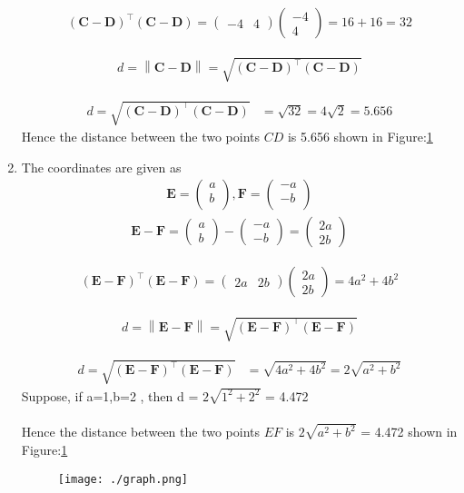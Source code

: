 \documentclass[12pt]{article}
\providecommand{\brak}[1]{\ensuremath{\left(#1\right)}}
\providecommand{\norm}[1]{\left\lVert#1\right\rVert}
\newcommand{\myvec}[1]{\ensuremath{\begin{pmatrix}#1\end{pmatrix}}}
\let\vec\mathbf
\begin{document}
\begin{enumerate}
	
	
	\begin{align}
		(\vec{C}-\vec{D})^\top (\vec{C}-\vec{D}) = \myvec{-4&4} \myvec{-4\\4} = 16+16 = 32
	\end{align}
	
	\begin{align}
		d=\norm{\vec{C}-\vec{D}}=\sqrt{\brak{\vec{C} -\vec{D}}^{\top}\brak{\vec{C} -\vec{D}}}
	\end{align}

\begin{align}
d=\sqrt{\brak{\vec{C} -\vec{D}}^{\top}\brak{\vec{C} -\vec{D}}}
 &=\sqrt{32}=4\sqrt{2}=5.656
\end{align}	
	Hence the distance between the two points $CD$ is 5.656 shown in Figure:\ref{fig:Fig}
	

	
\item The coordinates are given as
	\begin{align}
	\vec{E} = \myvec{
		a\\
		b\\
		},
	\vec{F} = \myvec{
		-a\\
		-b\\
		}
	\end{align}
	\begin{align}
		\vec{E} - \vec{F} = \myvec{a\\b} - \myvec{-a\\-b} = \myvec{2a\\2b}		
	\end{align}
	
	
	
	\begin{align}
		(\vec{E}-\vec{F})^\top (\vec{E}-\vec{F}) = \myvec{2a&2b} \myvec{2a\\2b} = 4a^2+4b^2 
	\end{align}
	
	\begin{align}
		d=\norm{\vec{E}-\vec{F}}=\sqrt{\brak{\vec{E} -\vec{F}}^{\top}\brak{\vec{E} -\vec{F}}}
	\end{align}

\begin{align}
d=\sqrt{\brak{\vec{E} -\vec{F}}^{\top}\brak{\vec{E} -\vec{F}}}
 &=\sqrt{4a^2+4b^2 }=2\sqrt{a^2+b^2}
\end{align}	
 Suppose, if a=1,b=2 , then d = $2\sqrt{1^2+2^2}$ = 4.472\\
	\\Hence the distance between the two points $EF$ is $2\sqrt{a^2+b^2}$ = 4.472 shown in Figure:\ref{fig:Fig}

\begin{figure}[!h]
	\begin{center} 
	    \texttt{[image: ./graph.png]}
	\end{center}
\caption{}
\label{fig:Fig}
\end{figure}
\end{enumerate}
\end{document}
